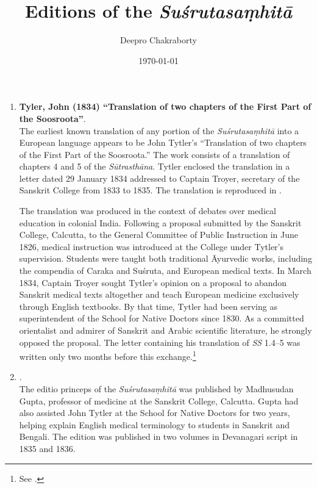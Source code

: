 \documentclass[12pt]{article}
\title{Editions of the \emph{Suśrutasaṃhitā}}
\author{Deepro Chakraborty}
\date{\today}
\begin{document}
\maketitle



\begin{enumerate}
	\item \textbf{Tyler, John (1834) “Translation of two chapters of the First Part of the Soosroota”}.\\
	The earliest known translation of any portion of the \emph{Suśrutasaṃhitā} into a European language appears to be John Tytler's “Translation of two chapters of the First Part of the Soosroota.” The work consists of a translation of chapters 4 and 5 of the \emph{Sūtrasthāna}. Tytler enclosed the translation in a letter dated 29 January 1834 addressed to Captain Troyer, secretary of the Sanskrit College from 1833 to 1835. The translation is reproduced in .
	
	The translation was produced in the context of debates over medical education in colonial India. Following a proposal submitted by the Sanskrit College, Calcutta, to the General Committee of Public Instruction in June 1826, medical instruction was introduced at the College under Tytler's supervision. Students were taught both traditional Āyurvedic works, including the compendia of Caraka and Suśruta, and European medical texts. In March 1834, Captain Troyer sought Tytler's opinion on a proposal to abandon Sanskrit medical texts altogether and teach European medicine exclusively through English textbooks. By that time, Tytler had been serving as superintendent of the School for Native Doctors since 1830. As a committed orientalist and admirer of Sanskrit and Arabic scientific literature, he strongly opposed the proposal. The letter containing his translation of \emph{SS} 1.4--5 was written only two months before this exchange.\footnote{See \cite[145, 151--152, 160--161]{Sen1991}.}
	
	
	
	
	\item \textbf{}.\\ 
	The editio princeps of the \emph{Suśrutasaṃhitā} was published by Madhusudan Gupta, professor of medicine at the Sanskrit College, Calcutta. Gupta had also assisted John Tytler at the School for Native Doctors for two years, helping explain English medical terminology to students in Sanskrit and Bengali. The edition was published in two volumes in Devanagari script in 1835 and 1836.
	

\end{enumerate}
\end{document}
